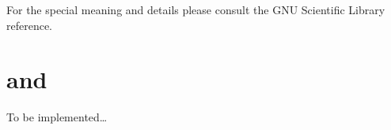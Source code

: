 \begin{seealso}
For the special meaning and details please consult the GNU Scientific Library
reference.
\end{seealso}

\section{\protect{} and \protect{}}

To be implemented\dots

